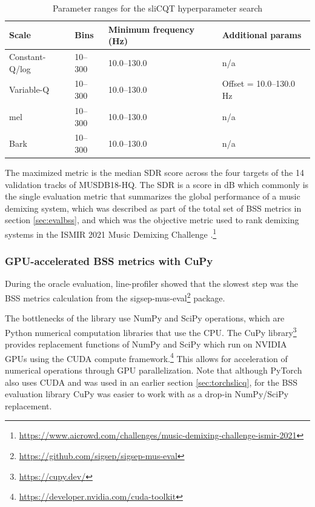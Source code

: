 \documentclass[report.tex]{subfiles}
\begin{document}
\begin{table}[ht]
	\centering
	\caption{Parameter ranges for the sliCQT hyperparameter search}
	\label{table:slicqparams}
\begin{tabular}{ |l|l|l|l| }
	 \hline
	 Scale & Bins & Minimum frequency (Hz) & Additional params \\
	 \hline
	 \hline
	 Constant-Q/log & 10--300 & 10.0--130.0 & n/a \\
	 \hline
	 Variable-Q & 10--300 & 10.0--130.0 & Offset = 10.0--130.0 Hz \\
	 \hline
	 \hline
	 mel & 10--300 & 10.0--130.0 & n/a \\
	 \hline
	 Bark & 10--300 & 10.0--130.0 & n/a \\
	 \hline
\end{tabular}
\end{table}

The maximized metric is the median SDR score across the four targets of the 14 validation tracks of MUSDB18-HQ. The SDR is a score in dB which commonly is the single evaluation metric that summarizes the global performance of a music demixing system, which was described as part of the total set of BSS metrics in section \ref{sec:evalbss}, and which was the objective metric used to rank demixing systems in the ISMIR 2021 Music Demixing Challenge \parencite{mdx21}.\footnote{\url{https://www.aicrowd.com/challenges/music-demixing-challenge-ismir-2021}}

\newpagefill

\subsubsection{GPU-accelerated BSS metrics with CuPy}
\label{sec:fasterbsscupy}

During the oracle evaluation, line-profiler showed that the slowest step was the BSS metrics calculation from the sigsep-mus-eval\footnote{\url{https://github.com/sigsep/sigsep-mus-eval}} package.

The bottlenecks of the library use NumPy and SciPy operations, which are Python numerical computation libraries that use the CPU. The CuPy library\footnote{\url{https://cupy.dev/}} provides replacement functions of NumPy and SciPy which run on NVIDIA GPUs using the CUDA compute framework.\footnote{\url{https://developer.nvidia.com/cuda-toolkit}} This allows for acceleration of numerical operations through GPU parallelization. Note that although PyTorch also uses CUDA and was used in an earlier section \ref{sec:torchslicq}, for the BSS evaluation library CuPy was easier to work with as a drop-in NumPy/SciPy replacement.
\end{document}
